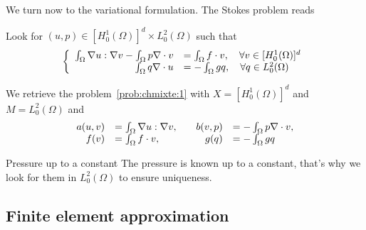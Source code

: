 We turn now to the variational formulation.  The Stokes problem reads
    \begin{problem}
      \label{prob:chmixte:4}
      Look for $(u,p) \in [H^1_0(\Omega)]^d \times L^2_0(\Omega)$ such that
      \begin{equation}
        \label{eq:chmixte:25}
      \left\{
        \begin{array}[c]{rl}
          \int_\Omega \nabla u : \nabla v -\int_\Omega p \nabla \cdot v  & =
          \int_\Omega f \cdot v, \quad \forall v \in [H^1_0(\Omega)]^d\\
          \int_\Omega q \nabla \cdot u & = - \int_\Omega g q, \quad \forall q \in L^2_0(\Omega)
        \end{array}
      \right.
    \end{equation}
    \end{problem}
    We retrieve the problem~\ref{prob:chmixte:1} with $X=[H^1_0(\Omega)]^d$ and
    $M=L^2_0(\Omega)$ and
    \begin{equation}
      \label{eq:chmixte:22}
      \begin{array}[c]{rlrl}
      a(u,v) &= \int_\Omega \nabla u : \nabla v,& \quad b(v,p) &= -\int_\Omega p
      \nabla \cdot v,\\
      \quad f(v) &=  \int_\Omega f \cdot v,& \quad g(q) &= - \int_\Omega g q
      \end{array}
    \end{equation}
    \begin{remark}{Pressure up to a constant}
      The pressure is known up to a constant, that's why we look for them in
      $L^2_0(\Omega)$ to ensure uniqueness.
    \end{remark}





%

\subsection{Finite element approximation}
\label{sec:finite-elem-appr-1}

